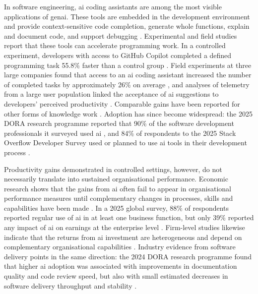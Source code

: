 In software engineering, \gls{ai} coding assistants are among the most visible applications of \gls{genai}. These tools are embedded in the development environment and provide context-sensitive code completion, generate whole functions, explain and document code, and support debugging \parencite{LiangJT2024, Sergeyuk2025}. Experimental and field studies report that these tools can accelerate programming work. In a controlled experiment, developers with access to GitHub Copilot completed a defined programming task 55.8\% faster than a control group \parencite{Peng2023}. Field experiments at three large companies found that access to an \gls{ai} coding assistant increased the number of completed tasks by approximately 26\% on average \parencite{Cui2026}, and analyses of telemetry from a large user population linked the acceptance of \gls{ai} suggestions to developers' perceived productivity \parencite{Ziegler2024}. Comparable gains have been reported for other forms of knowledge work \parencite{Noy2023, Brynjolfsson2025}. Adoption has since become widespread: the 2025 DORA research programme reported that 90\% of the software development professionals it surveyed used \gls{ai} \parencite{DORA2025}, and 84\% of respondents to the 2025 Stack Overflow Developer Survey used or planned to use \gls{ai} tools in their development process \parencite{StackOverflow2025}.

Productivity gains demonstrated in controlled settings, however, do not necessarily translate into sustained organisational performance. Economic research shows that the gains from \gls{ai} often fail to appear in organisational performance measures until complementary changes in processes, skills and capabilities have been made \parencite{Brynjolfsson2021}. In a 2025 global survey, 88\% of respondents reported regular use of \gls{ai} in at least one business function, but only 39\% reported any impact of \gls{ai} on earnings at the enterprise level \parencite{McKinsey2025}. Firm-level studies likewise indicate that the returns from \gls{ai} investment are heterogeneous and depend on complementary organisational capabilities \parencite{Babina2024, Mikalef2021}. Industry evidence from software delivery points in the same direction: the 2024 DORA research programme found that higher \gls{ai} adoption was associated with improvements in documentation quality and code review speed, but also with small estimated decreases in software delivery throughput and stability \parencite{Harvey2024}.

